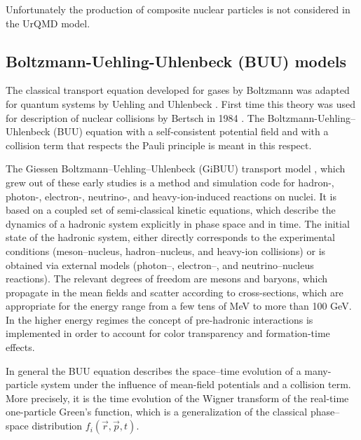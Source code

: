 Unfortunately the production of composite nuclear particles is not considered in the UrQMD model.



\subsection{Boltzmann-Uehling-Uhlenbeck (BUU) models}

The classical transport equation developed for gases by Boltzmann
was adapted for quantum systems by Uehling and Uhlenbeck \cite{Uehling1933}.
First time this theory was used for description of nuclear collisions by Bertsch in 1984 \cite{Bertsch1984}. The Boltzmann-Uehling–Uhlenbeck (BUU)  equation with a self-consistent potential field and with a collision term that respects the Pauli principle is meant in this respect.

The Giessen Boltzmann–Uehling–Uhlenbeck (GiBUU) transport model \cite{GiBUUBuss2012}, which grew out of these early studies is a method
and simulation code for hadron-, photon-, electron-, neutrino-, and heavy-ion-induced reactions on nuclei. It is based on
a coupled set of semi-classical kinetic equations, which describe the dynamics of a hadronic system explicitly in phase
space and in time. The initial state of the hadronic system, either directly corresponds to the experimental conditions
(meson–nucleus, hadron–nucleus, and heavy-ion collisions) or is obtained via external models (photon–, electron–, and
neutrino–nucleus reactions). The relevant degrees of freedom are mesons and baryons, which propagate in the mean fields
and scatter according to cross-sections, which are appropriate for the energy range from a few tens of MeV to more than
100 GeV. In the higher energy regimes the concept of pre-hadronic interactions is implemented in order to account for
color transparency and formation-time effects.

In general the BUU equation describes the space–time evolution of a many-particle system under the influence of mean-field
potentials and a collision term. More precisely, it is the time evolution of the Wigner transform of the real-time one-particle
Green’s function, which is a generalization of the classical phase–space distribution $f_{i}(\vec{r},\vec{p},t)$. 

